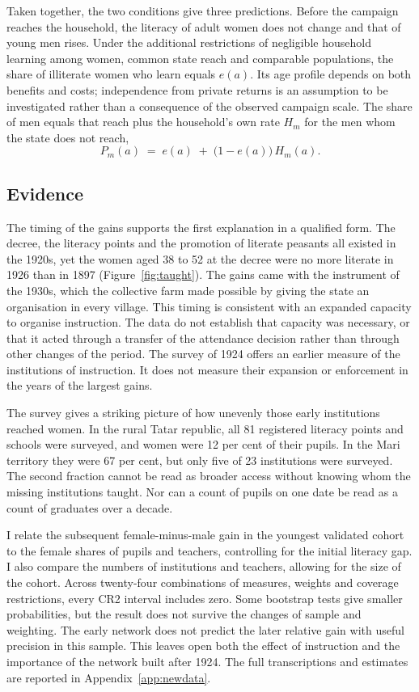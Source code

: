 \documentclass[12pt]{article}
\begin{document}
Taken together, the two conditions give three predictions. Before the campaign reaches the household, the literacy of adult women does not change and that of young men rises. Under the additional restrictions of negligible household learning among women, common state reach and comparable populations, the share of illiterate women who learn equals $e(a)$. Its age profile depends on both benefits and costs; independence from private returns is an assumption to be investigated rather than a consequence of the observed campaign scale. The share of men equals that reach plus the household's own rate $H_m$ for the men whom the state does not reach,
\begin{equation}\label{eq:mixmain}
  P_m(a) \;=\; e(a) \;+\; \big(1-e(a)\big)\,H_m(a).
\end{equation}

\subsection{Evidence}

The timing of the gains supports the first explanation in a qualified form. The decree, the literacy points and the promotion of literate peasants all existed in the 1920s, yet the women aged 38 to 52 at the decree were no more literate in 1926 than in 1897 (Figure~\ref{fig:taught}). The gains came with the instrument of the 1930s, which the collective farm made possible by giving the state an organisation in every village. This timing is consistent with an expanded capacity to organise instruction. The data do not establish that capacity was necessary, or that it acted through a transfer of the attendance decision rather than through other changes of the period. The survey of 1924 offers an earlier measure of the institutions of instruction. It does not measure their expansion or enforcement in the years of the largest gains.

The survey gives a striking picture of how unevenly those early institutions reached women. In the rural Tatar republic, all 81 registered literacy points and schools were surveyed, and women were 12 per cent of their pupils. In the Mari territory they were 67 per cent, but only five of 23 institutions were surveyed. The second fraction cannot be read as broader access without knowing whom the missing institutions taught. Nor can a count of pupils on one date be read as a count of graduates over a decade.

I relate the subsequent female-minus-male gain in the youngest validated cohort to the female shares of pupils and teachers, controlling for the initial literacy gap. I also compare the numbers of institutions and teachers, allowing for the size of the cohort. Across twenty-four combinations of measures, weights and coverage restrictions, every CR2 interval includes zero. Some bootstrap tests give smaller probabilities, but the result does not survive the changes of sample and weighting. The early network does not predict the later relative gain with useful precision in this sample. This leaves open both the effect of instruction and the importance of the network built after 1924. The full transcriptions and estimates are reported in Appendix~\ref{app:newdata}.
\end{document}
